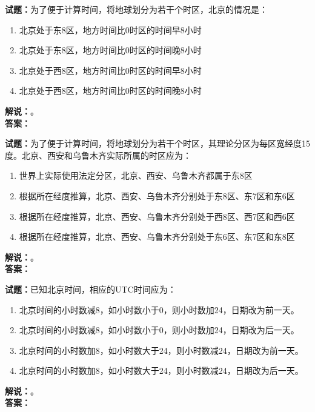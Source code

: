 \documentclass{ctexbook}
\begin{document}
\vspace{\baselineskip}

\noindent\textbf{试题：}为了便于计算时间，将地球划分为若干个时区，北京的情况是：
\begin{enumerate}[leftmargin=3em]
  \item 北京处于东8区，地方时间比0时区的时间早8小时
  \item 北京处于东8区，地方时间比0时区的时间晚8小时
  \item 北京处于西8区，地方时间比0时区的时间早8小时
  \item 北京处于西8区，地方时间比0时区的时间晚8小时
\end{enumerate}
\noindent\textbf{解说：}\textbf{}。\\\noindent\textbf{答案：}

\vspace{\baselineskip}

\noindent\textbf{试题：}为了便于计算时间，将地球划分为若干个时区，其理论分区为每区宽经度15度。北京、西安和乌鲁木齐实际所属的时区应为：
\begin{enumerate}[leftmargin=3em]
  \item 世界上实际使用法定分区，北京、西安、乌鲁木齐都属于东8区
  \item 根据所在经度推算，北京、西安、乌鲁木齐分别处于东8区、东7区和东6区
  \item 根据所在经度推算，北京、西安、乌鲁木齐分别处于西8区、西7区和西6区
  \item 根据所在经度推算，北京、西安、乌鲁木齐分别处于东6区、东7区和东8区
\end{enumerate}
\noindent\textbf{解说：}\textbf{}。\\\noindent\textbf{答案：}

\vspace{\baselineskip}

\noindent\textbf{试题：}已知北京时间，相应的UTC时间应为：
\begin{enumerate}[leftmargin=3em]
  \item 北京时间的小时数减8，如小时数小于0，则小时数加24，日期改为前一天。
  \item 北京时间的小时数减8，如小时数小于0，则小时数加24，日期改为后一天。
  \item 北京时间的小时数加8，如小时数大于24，则小时数减24，日期改为前一天。
  \item 北京时间的小时数加8，如小时数大于24，则小时数减24，日期改为后一天。
\end{enumerate}
\noindent\textbf{解说：}\textbf{}。\\\noindent\textbf{答案：}
\end{document}
